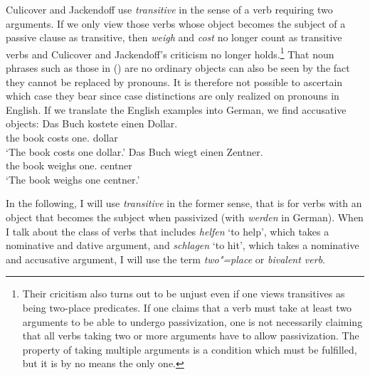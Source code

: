 Culicover and Jackendoff use \emph{transitive} in the sense of a verb requiring two arguments. If we only view those verbs whose object becomes the subject of
a passive clause as transitive, then \emph{weigh} and \emph{cost} no longer count as transitive verbs and Culicover and Jackendoff's criticism no longer holds.\footnote{%
Their cricitism also turns out to be unjust even if one views transitives as being two-place predicates. If one claims that a verb must take at least two arguments to be able
to undergo passivization, one is not necessarily claiming that all verbs taking two or more arguments have to allow passivization. The property of taking multiple arguments is
a condition which must be fulfilled, but it is by no means the only one.
}
That noun phrases such as those in () are no ordinary objects can also be seen by the fact they cannot be replaced by pronouns. It is therefore not possible to ascertain
which case they bear since case distinctions are only realized on pronouns in English.
If we translate the English examples into German, we find accusative objects:
\eal
\ex 
\gll Das Buch kostete einen Dollar.\\
      the book costs one.\acc{} dollar\\
\glt `The book costs one dollar.'
\ex 
\gll Das Buch wiegt einen Zentner.\\
     the book weighs one.\acc{} centner\\
\glt `The book weighs one centner.'
\zl



In the following, I will use \emph{transitive} in the former sense, that is for verbs with an object that becomes the subject when passivized (\eg with
\emph{werden} in German). When I talk about the class of verbs that includes \emph{helfen} `to help', which takes a nominative and dative argument, and \emph{schlagen} `to hit', 
which takes a nominative and accusative argument, I will use the term \emph{two"=place} or \emph{bivalent verb}.

